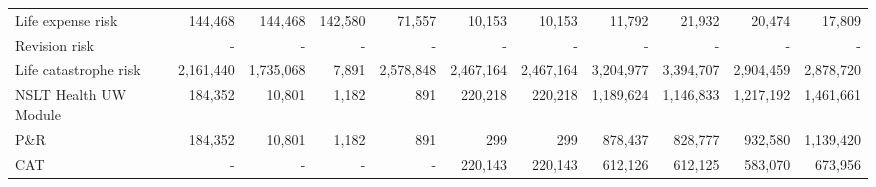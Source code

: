 \begin{landscape}
\begin{longtable}{ l  r  r  r  r  r  r  r  r  r  r  }
    Life expense risk & 144,468 & 144,468 & 142,580 & 71,557 & 10,153 & 10,153 & 11,792 & 21,932 & 20,474 & 17,809 \\

    Revision risk & - & - & - & - & - & - & - & - & - & - \\

    Life catastrophe risk & 2,161,440 & 1,735,068 & 7,891 & 2,578,848 & 2,467,164 & 2,467,164 & 3,204,977 & 3,394,707 & 2,904,459 & 2,878,720 \\

    NSLT Health UW Module & 184,352 & 10,801 & 1,182 & 891 & 220,218 & 220,218 & 1,189,624 & 1,146,833 & 1,217,192 & 1,461,661 \\

    P\&R & 184,352 & 10,801 & 1,182 & 891 & 299 & 299 & 878,437 & 828,777 & 932,580 & 1,139,420 \\

    CAT & - & - & - & - & 220,143 & 220,143 & 612,126 & 612,125 & 583,070 & 673,956 \\

\end{longtable}
\end{landscape}